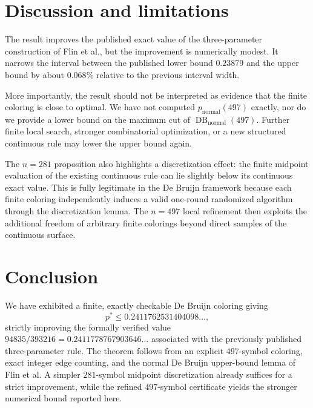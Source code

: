 \documentclass[11pt]{article}
\newcommand{\DB}{\operatorname{DB}}
\newcommand{\normal}{\mathrm{normal}}
\newcommand{\1}{\mathbf{1}}
\begin{document}
\section{Discussion and limitations}

The result improves the published exact value of the three-parameter
construction of Flin et al., but the improvement is numerically modest.  It narrows the interval between the published lower
bound $0.23879$ and the upper bound by about $0.068\%$ relative to the
previous interval width.

More importantly, the result should not be interpreted as evidence that the
finite coloring is close to optimal.  We have not computed
$p_{\normal}(497)$ exactly, nor do we provide a lower bound on the maximum cut
of $\DB_{\normal}(497)$.  Further finite local search, stronger combinatorial
optimization, or a new structured continuous rule may lower the upper bound
again.

The $n = 281$ proposition also highlights a discretization effect: the finite
midpoint evaluation of the existing continuous rule can lie slightly below
its continuous exact value.  This is fully legitimate in the De Bruijn
framework because each finite coloring independently induces a valid
one-round randomized algorithm through the discretization lemma.  The
$n = 497$ local refinement then exploits the additional freedom of arbitrary
finite colorings beyond direct samples of the continuous surface.

\section{Conclusion}

We have exhibited a finite, exactly checkable De Bruijn coloring giving
\[
  p^*\le0.2411762531404098\ldots,
\]
strictly improving the formally verified value
$94835/393216=0.2411778767903646\ldots$ associated with the previously
published three-parameter rule.  The theorem follows from an explicit
$497$-symbol coloring, exact integer edge counting, and the normal De Bruijn
upper-bound lemma of Flin et al.  A simpler $281$-symbol midpoint
discretization already suffices for a strict improvement, while the refined
$497$-symbol certificate yields the stronger numerical bound reported here.
\end{document}
